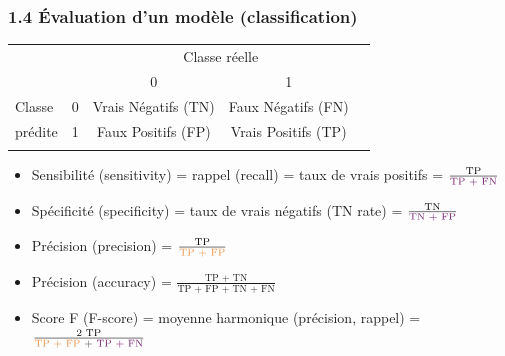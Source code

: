 {
\begin{frame}
  \frametitle{1.4 Évaluation d'un modèle (classification)}
  \begin{center}
    {\small \begin{tabular}[h]{|lc|c|c|c|} \hline
      & & \multicolumn{2}{|c|}{Classe réelle} & \\ \cline{3-4}
      & & 0 & 1 & \\ \hline
      Classe & \multicolumn{1}{|c|}{0} & Vrais Négatifs (TN) & Faux Négatifs (FN) & {\color{MyOrange}{TN+FN}} \\ \cline{2-5}
      prédite & \multicolumn{1}{|c|}{1} & Faux Positifs (FP) & Vrais Positifs (TP) & {\color{MyOrange}{TP+FP}} \\ \hline
       &  & {\color{Aubergine}{TN + FP}} & {\color{Aubergine}{TP + FN}} & \\ \hline
    \end{tabular}}
  \end{center}

  \begin{itemize}
  \item Sensibilité \textcolor{gray!70}{(sensitivity)} = rappel \textcolor{gray!70}{(recall)} = taux de vrais positifs = $\frac{\text{TP}}{\color{Aubergine}{\text{TP + FN}}}$
  \item Spécificité \textcolor{gray!70}{(specificity)} = taux de vrais négatifs \textcolor{gray!70}{(TN rate)} = $\frac{\text{TN}}{\color{Aubergine}{\text{TN + FP}}}$
  \item Précision \textcolor{gray!70}{(precision)} = $\frac{\text{TP}}{\color{MyOrange}{\text{TP + FP}}}$
  \item Précision \textcolor{gray!70}{(accuracy)} = $\frac{\text{TP + TN}}{\text{TP + FP + TN + FN}}$
  \item Score F \textcolor{gray!70}{(F-score)} = moyenne harmonique (précision, rappel) = $\frac{\text{2 TP}}{\color{MyOrange}{\text{TP + FP}} {\color{MyDarkGrey}{\text{ + }}} \color{Aubergine}{\text{TP + FN}}}$
  \end{itemize}
\end{frame}}

